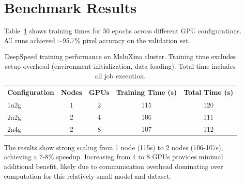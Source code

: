 \documentclass[12pt,a4paper]{article}
\begin{document}
\section{Benchmark Results}
Table~\ref{tab:results} shows training times for 50 epochs across different GPU configurations. All runs achieved $\sim$95.7\% pixel accuracy on the validation set.

\begin{table}[h]
\centering
\begin{tabular}{@{}lcccc@{}}
\toprule
\textbf{Configuration} & \textbf{Nodes} & \textbf{GPUs} & \textbf{Training Time (s)} & \textbf{Total Time (s)} \\
\midrule
1n2g & 1 & 2 & 115 & 120 \\
2n2g & 2 & 4 & 106 & 111 \\
2n4g & 2 & 8 & 107 & 112 \\
\bottomrule
\end{tabular}
\caption{DeepSpeed training performance on MeluXina cluster. Training time excludes setup overhead (environment initialization, data loading). Total time includes all job execution.}
\label{tab:results}
\end{table}

\noindent The results show strong scaling from 1 node (115s) to 2 nodes (106-107s), achieving a 7-8\% speedup. Increasing from 4 to 8 GPUs provides minimal additional benefit, likely due to communication overhead dominating over computation for this relatively small model and dataset.
\end{document}
